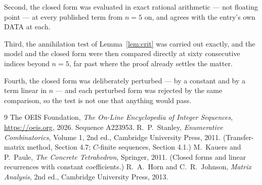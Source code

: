 \documentclass[11pt,a4paper]{article}
\theoremstyle{plain}
\theoremstyle{definition}
\begin{document}
Second, the closed form was evaluated in exact rational arithmetic --- not floating point ---
at every published term from $n=5$ on, and agrees with the entry's own DATA at each.

Third, the annihilation test of Lemma~\ref{lem:crit} was carried out exactly, and the model
and the closed form were then compared directly at sixty consecutive indices beyond
$n=5$, far past where the proof already settles the matter.

Fourth, the closed form was deliberately perturbed --- by a constant and by a term linear in
$n$ --- and each perturbed form was rejected by the same comparison, so the test is not one
that anything would pass.

\begin{thebibliography}{9}
 The OEIS Foundation, \emph{The On-Line Encyclopedia of Integer
Sequences}, \url{https://oeis.org}, 2026. Sequence A223953.
 R.~P.~Stanley, \emph{Enumerative Combinatorics}, Volume 1, 2nd ed.,
Cambridge University Press, 2011. (Transfer-matrix method, Section 4.7; $C$-finite sequences,
Section 4.1.)
 M.~Kauers and P.~Paule, \emph{The Concrete Tetrahedron}, Springer, 2011.
(Closed forms and linear recurrences with constant coefficients.)
 R.~A.~Horn and C.~R.~Johnson, \emph{Matrix Analysis}, 2nd ed., Cambridge
University Press, 2013.
\end{thebibliography}
\end{document}
